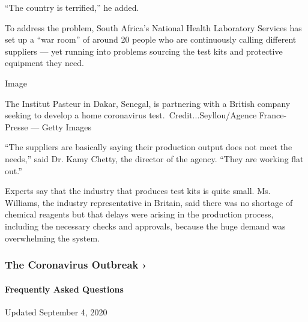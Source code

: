``The country is terrified,'' he added.

To address the problem, South Africa's National Health Laboratory
Services has set up a ``war room'' of around 20 people who are
continuously calling different suppliers --- yet running into problems
sourcing the test kits and protective equipment they need.

Image

The Institut Pasteur in Dakar, Senegal, is partnering with a British
company seeking to develop a home coronavirus
test.~Credit...Seyllou/Agence France-Presse --- Getty Images

``The suppliers are basically saying their production output does not
meet the needs,'' said Dr. Kamy Chetty, the director of the agency.
``They are working flat out.''

Experts say that the industry that produces test kits is quite small.
Ms. Williams, the industry representative in Britain, said there was no
shortage of chemical reagents but that delays were arising in the
production process, including the necessary checks and approvals,
because the huge demand was overwhelming the system.

\href{https://www.nytimes3xbfgragh.onion/news-event/coronavirus?action=click\&pgtype=Article\&state=default\&region=MAIN_CONTENT_3\&context=storylines_faq}{}

\hypertarget{the-coronavirus-outbreak-}{%
\subsubsection{The Coronavirus Outbreak
›}\label{the-coronavirus-outbreak-}}

\hypertarget{frequently-asked-questions}{%
\paragraph{Frequently Asked
Questions}\label{frequently-asked-questions}}

Updated September 4, 2020

